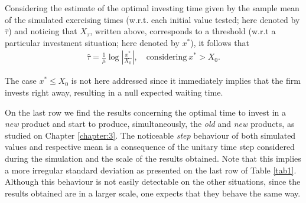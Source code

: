 Considering the estimate of the optimal investing time given by the sample mean of the simulated exercising times (w.r.t. each initial value tested; here denoted by $\hat{\tau}$) and noticing that $X_\tau$, written above, corresponds to a threshold (w.r.t a particular investment situation; here denoted by $x^*$), it follows that
\begin{align}
 \hat{\tau}=\frac{1}{\mu} \log \left|  \frac{x^*}{X_0} \right|, \quad \text{considering} \ x^*> X_0.
\end{align}

The case $x^*\leq X_0$ is not here addressed since it immediately implies that the firm invests right away, resulting in a null expected waiting time.





On the last row we find the results concerning the optimal time to invest in a \textit{new} product and start to produce, simultaneously, the \textit{old} and \textit{new} products, as studied on Chapter \ref{chapter:3}.
The noticeable \textit{step} behaviour of both simulated values and respective mean is a consequence of the unitary time step considered during the simulation and the scale of the results obtained. Note that this implies a more irregular standard deviation as presented on the last row of Table \ref{tab1}.
Although this behaviour is not easily detectable on the other situations, since the results obtained are in a larger scale, one expects that they behave the same way.


